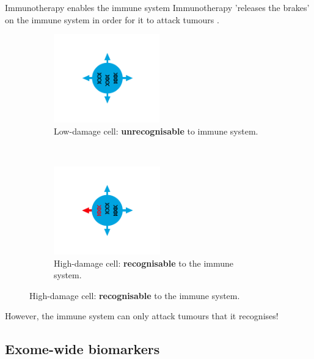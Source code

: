 \documentclass{beamer}
\begin{document}
\begin{frame}{Immunotherapy enables the immune system}
Immunotherapy 'releases the brakes' on the immune system in order for it to attack tumours \citep{pardoll_blockade_2012}.
\begin{figure}[t!]
    \centering
    \begin{subfigure}[t]{0.45\textwidth}
        \centering
        \includegraphics[height=1.5in]{figures/IC1.png}
        \caption{Low-damage cell: \textbf{unrecognisable} to immune system.}
    \end{subfigure}
    ~ 
    \begin{subfigure}[t]{0.45\textwidth}
        \centering
        \includegraphics[height=1.5in]{figures/IC2.png}
        \caption{High-damage cell: \textbf{recognisable} to the immune system.}
    \end{subfigure}
\end{figure}
However, the immune system can only attack tumours that it recognises!
\end{frame}

\subsection{Exome-wide biomarkers}
\end{document}
